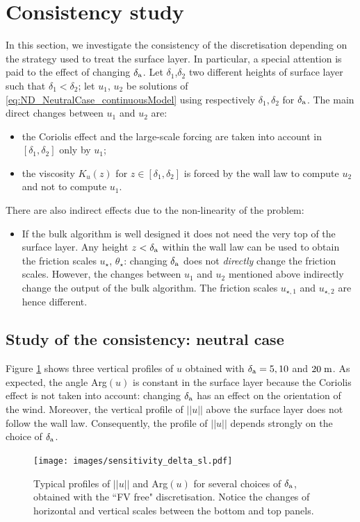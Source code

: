 \section{Consistency study}
\label{sec:ND_Consistency}
In this section, we investigate the consistency of the
discretisation depending on the strategy used to treat the
surface layer. In particular, a special attention is paid to
the effect of changing $\delta_{\rm a}$.
Let $\delta_1$,$\delta_2$ two
different heights of surface layer
such that $\delta_1 < \delta_2$;
let $u_1$, $u_2$ be solutions of 
\eqref{eq:ND_NeutralCase_continuousModel} using
respectively $\delta_1, \delta_2$ for $\delta_{\rm a}$.
The main direct changes between $u_1$ and $u_2$ are:
\begin{itemize}
\item the Coriolis effect and the large-scale forcing are
taken into account in $[\delta_{1}, \delta_{2}]$
		only by $u_1$;
\item the viscosity $K_u(z)$ for $z \in [\delta_{1}, \delta_{2}]$
	is forced by the wall law to compute $u_2$
		and not to compute $u_1$.
\end{itemize}
There are also indirect effects due to the non-linearity of the
problem:
\begin{itemize}
	\item If the bulk algorithm is well designed it does not
		need the very top of the surface layer. Any height
		$z<\delta_{\rm a}$ within the wall law can be used
		to obtain the friction scales $u_\star$,
		$\theta_\star$: changing $\delta_{\rm a}$ does
		not \textit{directly} change the friction scales.
		However, the changes between $u_1$ and $u_2$ mentioned
		above indirectly change the output of the
		bulk algorithm.
		The friction scales $u_{\star, 1}$ and $u_{\star, 2}$
		are hence different.
\end{itemize}
\subsection{Study of the consistency: neutral case}
Figure \ref{fig:ND_Consistency_sensitivity_delta_sl} shows
three vertical profiles of $u$ obtained with
$\delta_{\rm a} = 5, 10$ and $20 \; {\rm m}$.
As expected, the angle Arg$(u)$
is constant in the surface layer because
the Coriolis effect is not taken into
account: changing $\delta_{\rm a}$
has an effect on the orientation of the wind.
Moreover, the vertical profile of $||u||$ above the
surface layer does not follow the wall law.
Consequently, the profile of $||u||$ depends strongly
on the choice of $\delta_{\rm a}$.
%
\begin{figure}[h!]
	\centering
\texttt{[image: images/sensitivity\_delta\_sl.pdf]}
	\caption{Typical profiles of $||u||$ and Arg$(u)$ for several
	choices of $\delta_{\rm a}$, obtained with the ``FV free"
	discretisation. Notice the changes of horizontal
	and vertical scales between the bottom and top panels.}
	\label{fig:ND_Consistency_sensitivity_delta_sl}
\end{figure}

